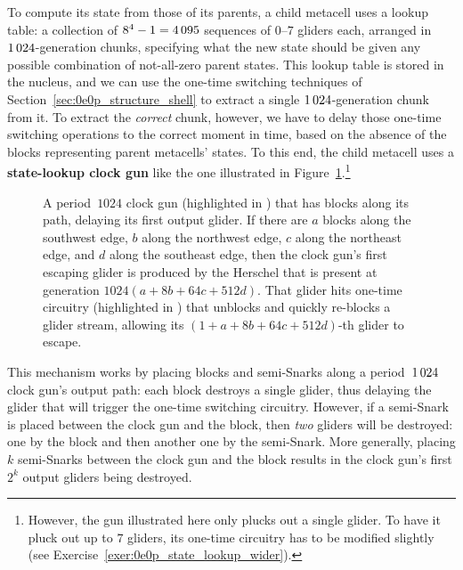 To compute its state from those of its parents, a child metacell uses a lookup table: a collection of $8^4 - 1 = 4{\,}095$ sequences of $0$--$7$ gliders each, arranged in $1{\,}024$-generation chunks, specifying what the new state should be given any possible combination of not-all-zero parent states. This lookup table is stored in the nucleus, and we can use the one-time switching techniques of Section~\ref{sec:0e0p_structure_shell} to extract a single $1{\,}024$-generation chunk from it. To extract the \emph{correct} chunk, however, we have to delay those one-time switching operations to the correct moment in time, based on the absence of the blocks representing parent metacells' states. To this end, the child metacell uses a \textbf{state-lookup clock gun} like the one illustrated in Figure~\ref{fig:state_lookup_clock_gun}.\footnote{However, the gun illustrated here only plucks out a single glider. To have it pluck out up to $7$ gliders, its one-time circuitry has to be modified slightly (see Exercise~\ref{exer:0e0p_state_lookup_wider}).}

\begin{figure}[!htb]
	\centering
	\caption{A period~$1024$ clock gun (highlighted in ) that has blocks along its path, delaying its first output glider. If there are $a$ blocks along the southwest edge, $b$ along the northwest edge, $c$ along the northeast edge, and $d$ along the southeast edge, then the clock gun's first escaping glider is produced by the Herschel that is present at generation $1024(a + 8b + 64c + 512d)$. That glider hits one-time circuitry (highlighted in ) that unblocks and quickly re-blocks a glider stream, allowing its $(1 + a + 8b + 64c + 512d)$-th glider to escape.}
	\label{fig:state_lookup_clock_gun}
\end{figure}

This mechanism works by placing blocks and semi-Snarks along a period~$1{\,}024$ clock gun's output path: each block destroys a single glider, thus delaying the glider that will trigger the one-time switching circuitry. However, if a semi-Snark is placed between the clock gun and the block, then \emph{two} gliders will be destroyed: one by the block and then another one by the semi-Snark. More generally, placing $k$ semi-Snarks between the clock gun and the block results in the clock gun's first $2^k$ output gliders being destroyed.

